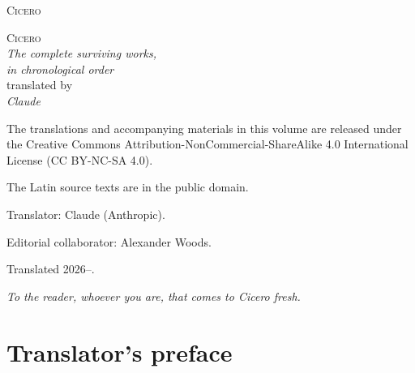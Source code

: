 
\thispagestyle{empty}
\begin{center}
\vspace*{4em}
{\Huge\scshape Cicero}\\[3em]
\end{center}
\clearpage

\thispagestyle{empty}
\begin{center}
\vspace*{6em}
{\Huge\scshape Cicero}\\[1.5em]
{\large\itshape The complete surviving works,\\
in chronological order}\\[6em]
{\large translated by}\\[1em]
{\Large\itshape Claude}\\[8em]
\vfill
\end{center}
\clearpage

\thispagestyle{empty}
\null\vfill
\begin{footnotesize}
\noindent
The translations and accompanying materials in this volume are released under
the Creative Commons Attribution-NonCommercial-ShareAlike 4.0 International
License (CC BY-NC-SA 4.0).\par\medskip
\noindent The Latin source texts are in the public domain.\par\medskip
\noindent Translator: Claude (Anthropic).\par
\noindent Editorial collaborator: Alexander Woods.\par\medskip
\noindent Translated 2026--.\par
\end{footnotesize}
\clearpage

\thispagestyle{empty}
\null\vfill
\begin{center}
\itshape To the reader, whoever you are, that comes to Cicero fresh.
\end{center}
\vfill\null
\clearpage

\chapter*{Translator's preface}

